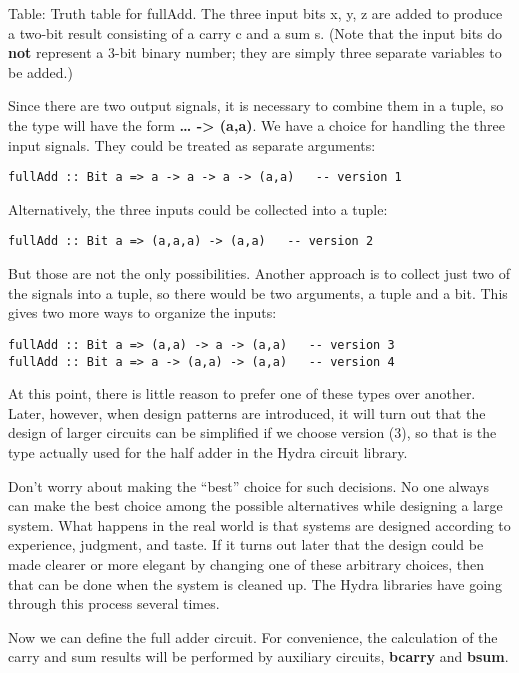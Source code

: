 \documentclass[11pt]{article}
\begin{document}
Table: Truth table for fullAdd.  The three input bits x, y, z are
added to produce a two-bit result consisting of a carry c and a sum s.
(Note that the input bits do \textbf{not} represent a 3-bit binary number;
they are simply three separate variables to be added.)

Since there are two output signals, it is necessary to combine them in
a tuple, so the type will have the form \textbf{\ldots{} -> (a,a)}.  We have a
choice for handling the three input signals.  They could be treated as
separate arguments:

\begin{verbatim}
fullAdd :: Bit a => a -> a -> a -> (a,a)   -- version 1
\end{verbatim}

Alternatively, the three inputs could be collected into a tuple:

\begin{verbatim}
fullAdd :: Bit a => (a,a,a) -> (a,a)   -- version 2
\end{verbatim}

But those are not the only possibilities.  Another approach is to
collect just two of the signals into a tuple, so there would be two
arguments, a tuple and a bit.  This gives two more ways to organize
the inputs:


\begin{verbatim}
fullAdd :: Bit a => (a,a) -> a -> (a,a)   -- version 3
fullAdd :: Bit a => a -> (a,a) -> (a,a)   -- version 4
\end{verbatim}



At this point, there is little reason to prefer one of these types
over another.  Later, however, when design patterns are introduced, it
will turn out that the design of larger circuits can be simplified if
we choose version (3), so that is the type actually used for the half
adder in the Hydra circuit library.

Don't worry about making the ``best'' choice for such decisions.  No
one always can make the best choice among the possible alternatives
while designing a large system.  What happens in the real world is
that systems are designed according to experience, judgment, and
taste.  If it turns out later that the design could be made clearer or
more elegant by changing one of these arbitrary choices, then that can
be done when the system is cleaned up.  The Hydra libraries have going
through this process several times.

Now we can define the full adder circuit.  For convenience, the
calculation of the carry and sum results will be performed by
auxiliary circuits, \textbf{bcarry} and \textbf{bsum}.
\end{document}
